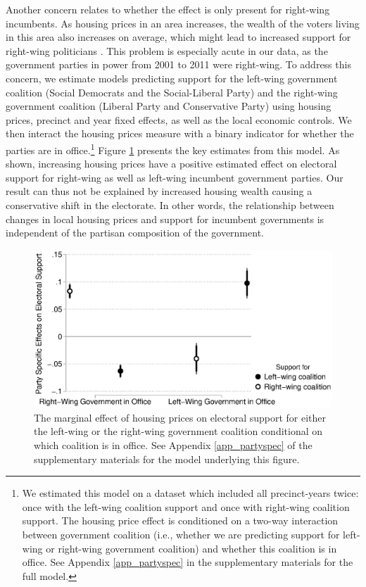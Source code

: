\documentclass[12pt,a4paper]{article}
\begin{document}
	Another concern relates to whether the effect is only present for right-wing incumbents. As housing prices in an area increases, the wealth of the voters living in this area also increases on average, which might lead to increased support for right-wing politicians \cite{ansell2014political}. This problem is especially acute in our data, as the government parties in power from 2001 to 2011 were right-wing. To address this concern, we estimate models predicting support for the left-wing government coalition (Social Democrats and the Social-Liberal Party) and the right-wing government coalition (Liberal Party and Conservative Party) using housing prices, precinct and year fixed effects, as well as the local economic controls. We then interact the housing prices measure with a binary indicator for whether the parties are in office.\footnote{We estimated this model on a dataset which included all precinct-years twice: once with the left-wing coalition support and once with right-wing coalition support. The housing price effect is conditioned on a two-way interaction between government coalition (i.e., whether we are predicting support for left-wing or right-wing government coalition) and whether this coalition is in office. See Appendix \ref{app_partyspec} in the supplementary materials for the full model.} Figure \ref{partyspecific} presents the key estimates from this model. As shown, increasing housing prices have a positive estimated effect on electoral support for right-wing as well as left-wing incumbent government parties. Our result can thus not be explained by increased housing wealth causing a conservative shift in the electorate. In other words, the relationship between changes in local housing prices and support for incumbent governments is independent of the partisan composition of the government.
	
	\begin{figure}
		\includegraphics[width=1\textwidth]{../figures/partyspecific.eps}
		\caption{The marginal effect of housing prices on electoral support for either the left-wing or the right-wing government coalition conditional on which coalition is in office. See Appendix \ref{app_partyspec} of the supplementary materials for the model underlying this figure.}
		\label {partyspecific}
	\end{figure}
	
\end{document}
